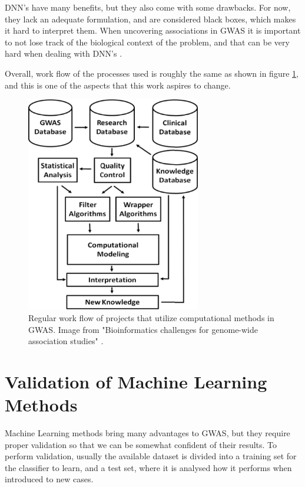\gls{DNN}'s have many benefits, but they also come with some drawbacks. For now, they lack an adequate formulation, and are considered black boxes, which makes it hard to interpret them. When uncovering associations in \gls{GWAS} it is important to not lose track of the biological context of the problem, and that can be very hard when dealing with \gls{DNN}'s \cite{mamoshina2016applications}.

Overall, work flow of the processes used is roughly the same as shown in figure \ref{fig:flow}, and this is one of the aspects that this work aspires to change.

\begin{figure}[h]
	\centering
	\includegraphics[width=3in]{../images/sota/btp713f5.jpeg}
	\caption{Regular work flow of projects that utilize computational methods in \gls{GWAS}. Image from "Bioinformatics challenges for genome-wide association studies" \cite{moore2010bioinformatics}.} 
	\label{fig:flow}
\end{figure}

\section{Validation of Machine Learning Methods}

Machine Learning methods bring many advantages to \gls{GWAS}, but they require proper validation so that we can be somewhat confident of their results. To perform validation, usually the available dataset is divided into a training set for the classifier to learn, and a test set, where it is analysed how it performs when introduced to new cases.

